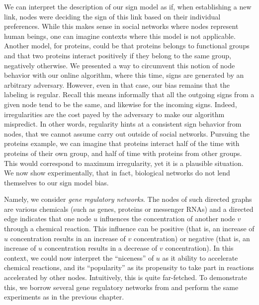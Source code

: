 We can interpret the description of our sign model as if, when establishing a new link, nodes were
deciding the sign of this link based on their individual preferences. While this makes sense in
social networks where nodes represent human beings, one can imagine contexts where this model is not
applicable. Another model, \eg{} for proteins, could be that proteins belongs to functional groups
and that two proteins interact positively if they belong to the same group, negatively otherwise.
We presented a way to circumvent this notion of node behavior with our online algorithm, where this
time, signs are generated by an arbitrary adversary. However, even in that case, our bias remains
that the labeling is regular. Recall this means informally that all the outgoing signs from a given
node tend to be the same, and likewise for the incoming signs. Indeed, irregularities are the cost
payed by the adversary to make our algorithm mispredict. In other words, regularity hints at a
consistent sign behavior from nodes, that we cannot assume carry out outside of social networks.
Pursuing the proteins example, we can imagine that proteins interact half of the time with proteins
of their own group, and half of time with proteins from other groups. This would correspond to
maximum irregularity, yet it is a plausible situation. We now show experimentally, that in fact,
biological networks do not lend themselves to our sign model bias.


Namely, we consider \emph{gene regulatory networks}. The nodes of such directed graphs are various
chemicals (such as genes, proteins or messenger RNAs) and a directed edge \euv{} indicates that one
node $u$ influences the concentration of another node $v$ through a chemical reaction. This
influence can be positive (that is, an increase of $u$ concentration results in an increase of $v$
concentration) or negative (that is, an increase of $u$ concentration results in a decrease of $v$
concentration). In this context, we could now interpret the \enquote{niceness} of $u$ as it ability
to accelerate chemical reactions, and its \enquote{popularity} as its propensity to take part in
reactions accelerated by other nodes. Intuitively, this is quite far-fetched. To demonstrate this,
we borrow several gene regulatory networks from \autocite[Table 1]{BioSigned09} and perform the same
experiments as in the previous chapter.
